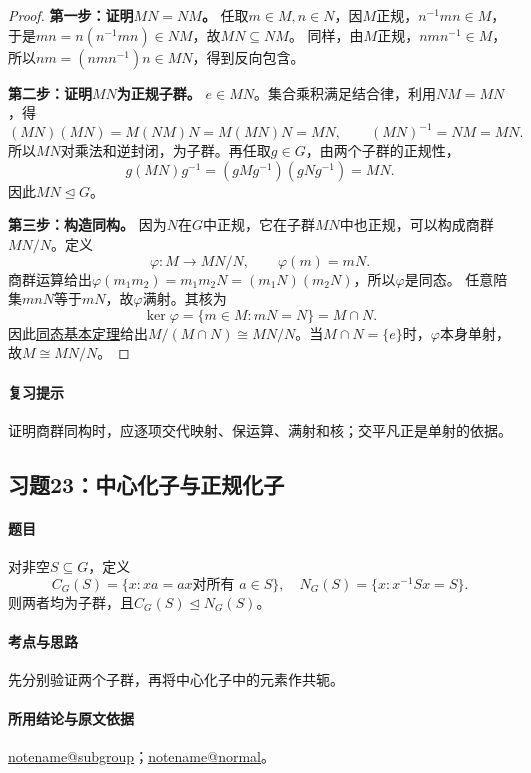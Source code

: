 \documentclass[UTF8,a4paper,11pt,fontset=windows]{ctexart}
\makeatletter
\newcommand{\noteref}[1]{\hyperref[note:#1]{\csname notename@#1\endcsname}}
\newcommand{\proofref}[2]{\hyperref[note:#1]{#2}}
\makeatother
\begin{document}
\begin{proof}
\textbf{第一步：证明$MN=NM$。}
任取$m\in M,n\in N$，因$M$正规，$n^{-1}mn\in M$，于是$mn=n(n^{-1}mn)\in NM$，故$MN\subseteq NM$。
同样，由$M$正规，$nmn^{-1}\in M$，所以$nm=(nmn^{-1})n\in MN$，得到反向包含。

\textbf{第二步：证明$MN$为正规子群。}
$e\in MN$。集合乘积满足结合律，利用$NM=MN$，得
\[
(MN)(MN)=M(NM)N=M(MN)N=MN,
\qquad (MN)^{-1}=NM=MN.
\]
所以$MN$对乘法和逆封闭，为子群。再任取$g\in G$，由两个子群的正规性，
\[
g(MN)g^{-1}=(gMg^{-1})(gNg^{-1})=MN.
\]
因此$MN\trianglelefteq G$。

\textbf{第三步：构造同构。}
因为$N$在$G$中正规，它在子群$MN$中也正规，可以构成商群$MN/N$。定义
\[
\varphi:M\longrightarrow MN/N,\qquad \varphi(m)=mN.
\]
商群运算给出$\varphi(m_1m_2)=m_1m_2N=(m_1N)(m_2N)$，所以$\varphi$是同态。
任意陪集$mnN$等于$mN$，故$\varphi$满射。其核为
\[
\ker\varphi=\{m\in M:mN=N\}=M\cap N.
\]
因此\proofref{firstiso}{同态基本定理}给出$M/(M\cap N)\cong MN/N$。当$M\cap N=\{e\}$时，$\varphi$本身单射，故$M\cong MN/N$。
\end{proof}

\paragraph{复习提示}
证明商群同构时，应逐项交代映射、保运算、满射和核；交平凡正是单射的依据。


\subsection{习题23：\texorpdfstring{中心化子与正规化子}{中心化子与正规化子}}
\label{ex:1:23}

\paragraph{题目}
对非空$S\subseteq G$，定义
\[
C_G(S)=\{x:xa=ax\text{对所有 }a\in S\},\quad
N_G(S)=\{x:x^{-1}Sx=S\}.
\]
则两者均为子群，且$C_G(S)\trianglelefteq N_G(S)$。

\paragraph{考点与思路}
先分别验证两个子群，再将中心化子中的元素作共轭。

\paragraph{所用结论与原文依据}
\noteref{subgroup}；\noteref{normal}。
\end{document}
